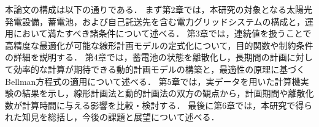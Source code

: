 本論文の構成は以下の通りである． まず第2章では，本研究の対象となる太陽光発電設備，蓄電池，および自己託送先を含む電力グリッドシステムの構成と，運用において満たすべき諸条件について述べる． 第3章では，連続値を扱うことで高精度な最適化が可能な線形計画モデルの定式化について，目的関数や制約条件の詳細を説明する． 第4章では，蓄電池の状態を離散化し，長期間の計画に対して効率的な計算が期待できる動的計画モデルの構築と，最適性の原理に基づくBellman方程式の適用について述べる． 第5章では，実データを用いた計算機実験の結果を示し，線形計画法と動的計画法の双方の観点から，計画期間や離散化数が計算時間に与える影響を比較・検討する． 
最後に第6章では，本研究で得られた知見を総括し，今後の課題と展望について述べる．